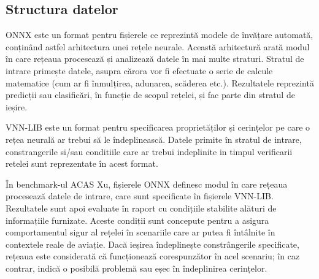 \documentclass[12pt,a4paper]{article}
\begin{document}
\subsection{Structura datelor}

ONNX este un format pentru fișierele ce reprezintă modele de învățare automată, conținând astfel arhitectura unei rețele neurale. Această arhitectură arată modul în care rețeaua procesează și analizează datele în mai multe straturi. Stratul de intrare primește datele, asupra cărora vor fi efectuate o serie de calcule matematice (cum ar fi înmulțirea, adunarea, scăderea etc.). Rezultatele reprezintă predicții sau clasificări, în funcție de scopul rețelei, și fac parte din stratul de ieșire.

VNN-LIB este un format pentru specificarea proprietăților și cerințelor pe care o rețea neurală ar trebui să le îndeplinească. Datele primite în stratul de intrare, constrangerile si/sau conditiile care ar trebui indeplinite in timpul verificarii retelei sunt reprezentate în acest format.

În benchmark-ul ACAS Xu, fișierele ONNX definesc modul în care rețeaua procesează datele de intrare, care sunt specificate în fișierele VNN-LIB. Rezultatele sunt apoi evaluate în raport cu condițiile stabilite alături de informațiile furnizate. Aceste condiții sunt concepute pentru a asigura comportamentul sigur al rețelei în scenariile care ar putea fi întâlnite în contextele reale de aviație. Dacă ieșirea îndeplinește constrângerile specificate, rețeaua este considerată că funcționează corespunzător în acel scenariu; în caz contrar, indică o posibilă problemă sau eșec în îndeplinirea cerințelor.
\end{document}
